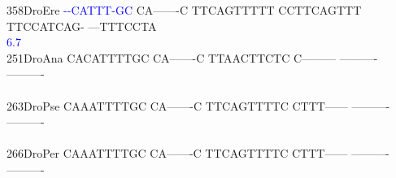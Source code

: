 \documentclass[11pt,twoside,reqno,a4paper]{article}
\begin{document}
{358\hspace*{1\charwidth}DroEre	\textcolor{Blue}{-}\textcolor{Blue}{-}\textcolor{Blue}{C}\textcolor{Blue}{A}\textcolor{Blue}{T}\textcolor{Blue}{T}\textcolor{Blue}{T}\textcolor{Blue}{-}\textcolor{Blue}{G}\textcolor{Blue}{C}	CA-------C	TTCAGTTTTT	CCTTCAGTTT	TTCCATCAG-	---TTTCCTA	\\
\hspace*{4\charwidth}\hspace*{7\charwidth}\hspace*{0\charwidth}\textcolor{Blue}{6.7}\hspace*{1\charwidth}\hspace*{1\charwidth}\hspace*{1\charwidth}\hspace*{1\charwidth}\hspace*{1\charwidth}\hspace*{1\charwidth}\\
251\hspace*{1\charwidth}DroAna	CACATTTTGC	CA-------C	TTAACTTCTC	C---------	----------	----------	\\
\hspace*{4\charwidth}\hspace*{7\charwidth}\hspace*{1\charwidth}\hspace*{1\charwidth}\hspace*{1\charwidth}\hspace*{1\charwidth}\hspace*{1\charwidth}\hspace*{1\charwidth}\\
263\hspace*{1\charwidth}DroPse	CAAATTTTGC	CA-------C	TTCAGTTTTC	CTTT------	----------	----------	\\
\hspace*{4\charwidth}\hspace*{7\charwidth}\hspace*{1\charwidth}\hspace*{1\charwidth}\hspace*{1\charwidth}\hspace*{1\charwidth}\hspace*{1\charwidth}\hspace*{1\charwidth}\\
266\hspace*{1\charwidth}DroPer	CAAATTTTGC	CA-------C	TTCAGTTTTC	CTTT------	----------	----------	\\
\hspace*{4\charwidth}\hspace*{7\charwidth}\hspace*{1\charwidth}\hspace*{1\charwidth}\hspace*{1\charwidth}\hspace*{1\charwidth}\hspace*{1\charwidth}\hspace*{1\charwidth}\\
}
\end{document}
